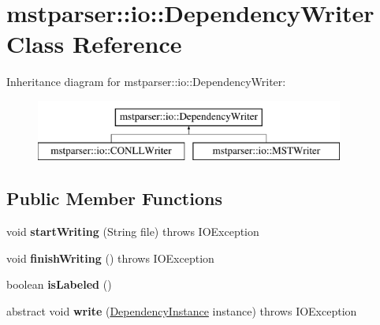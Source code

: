 \hypertarget{classmstparser_1_1io_1_1DependencyWriter}{
\section{mstparser::io::DependencyWriter Class Reference}
\label{classmstparser_1_1io_1_1DependencyWriter}
}
Inheritance diagram for mstparser::io::DependencyWriter:\begin{figure}[H]
\begin{center}
\leavevmode
\includegraphics[height=2cm]{classmstparser_1_1io_1_1DependencyWriter}
\end{center}
\end{figure}
\subsection*{Public Member Functions}
\begin{DoxyCompactItemize}
\item 
\hypertarget{classmstparser_1_1io_1_1DependencyWriter_a76ff97db1e16ce6aa0861c2997200cb4}{
void {\bfseries startWriting} (String file)  throws IOException }
\label{classmstparser_1_1io_1_1DependencyWriter_a76ff97db1e16ce6aa0861c2997200cb4}

\item 
\hypertarget{classmstparser_1_1io_1_1DependencyWriter_a0c56d0e59a7833b4d877f161928367aa}{
void {\bfseries finishWriting} ()  throws IOException }
\label{classmstparser_1_1io_1_1DependencyWriter_a0c56d0e59a7833b4d877f161928367aa}

\item 
\hypertarget{classmstparser_1_1io_1_1DependencyWriter_a9256e5c08ab4f46471ef44e5794f5ef6}{
boolean {\bfseries isLabeled} ()}
\label{classmstparser_1_1io_1_1DependencyWriter_a9256e5c08ab4f46471ef44e5794f5ef6}

\item 
\hypertarget{classmstparser_1_1io_1_1DependencyWriter_a2b54e6beccd6de24019987dc2f581496}{
abstract void {\bfseries write} (\hyperlink{classmstparser_1_1DependencyInstance}{DependencyInstance} instance)  throws IOException}
\label{classmstparser_1_1io_1_1DependencyWriter_a2b54e6beccd6de24019987dc2f581496}

\end{DoxyCompactItemize}
